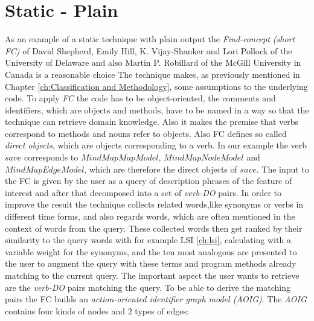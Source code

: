 \section{Static - Plain}
\label{sec:find-concept}
As an example of a static technique with plain output the \emph{Find-concept (short FC)} of David Shepherd, Emily Hill, K. Vijay-Shanker and Lori Pollock of the University of Delaware and also Martin P. Robillard of the McGill University in Canada is a reasonable choice
The technique makes, as previously mentioned in Chapter \ref{ch:Classification and Methodology}, some assumptions to the underlying code. To apply \emph{FC} the code has to be object-oriented, the comments and identifiers, which are objects and methods, have to be named in a way so that the technique can retrieve domain knowledge. Also it makes the premise that verbs correspond to methods and nouns refer to objects. Also FC defines so called \textit{direct objects}, which are objects corresponding to a verb. In our example the verb $save$ corresponds to $MindMapMapModel$, $MindMapNodeModel$ and $MindMapEdgeModel$, which are therefore the direct objects of $save$.\newline
\emptyLine
The input to the FC is given by the user as a query of description phrases of the feature of interest and after that decomposed into a set of \textit{verb-DO} pairs. In order to improve the result the technique collects related words,like synonyms or verbs in different time forms, and also regards words, which are often mentioned in the context of words from the query. These collected words then get ranked by their similarity to the query words with for example LSI \ref{ch:lsi}, calculating with a variable weight for the synonyms, and the ten most analogous are presented to the user to augment the query with these terms and program methods already matching to the current query.\newline
\emptyLine
The important aspect the user wants to retrieve are the \textit{verb-DO} pairs matching the query. To be able to derive the matching pairs the FC builds an \textit{action-oriented identifier graph model (AOIG)}. The \textit{AOIG} contains four kinds of nodes and 2 types of edges:

